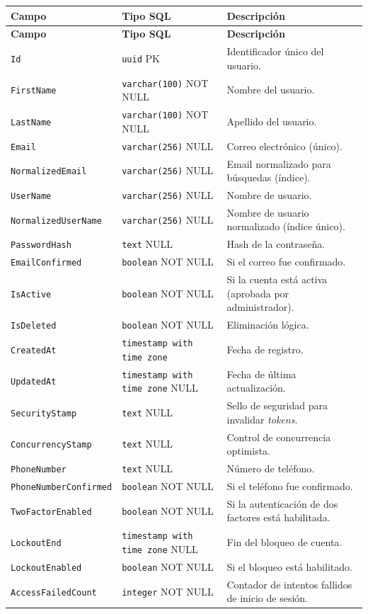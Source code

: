 \begin{longtable}{|p{3.5cm}|p{4cm}|p{7cm}|}
\hline
\textbf{Campo} & \textbf{Tipo SQL} & \textbf{Descripción} \\
\hline
\endfirsthead
\hline
\textbf{Campo} & \textbf{Tipo SQL} & \textbf{Descripción} \\
\hline
\endhead
\texttt{Id} & \texttt{uuid} PK & Identificador único del usuario. \\
\hline
\texttt{FirstName} & \texttt{varchar(100)} NOT NULL & Nombre del usuario. \\
\hline
\texttt{LastName} & \texttt{varchar(100)} NOT NULL & Apellido del usuario. \\
\hline
\texttt{Email} & \texttt{varchar(256)} NULL & Correo electrónico (único). \\
\hline
\texttt{NormalizedEmail} & \texttt{varchar(256)} NULL & Email normalizado para búsquedas (índice). \\
\hline
\texttt{UserName} & \texttt{varchar(256)} NULL & Nombre de usuario. \\
\hline
\texttt{Normalized\-UserName} & \texttt{varchar(256)} NULL & Nombre de usuario normalizado (índice único). \\
\hline
\texttt{PasswordHash} & \texttt{text} NULL & Hash de la contraseña. \\
\hline
\texttt{EmailConfirmed} & \texttt{boolean} NOT NULL & Si el correo fue confirmado. \\
\hline
\texttt{IsActive} & \texttt{boolean} NOT NULL & Si la cuenta está activa (aprobada por administrador). \\
\hline
\texttt{IsDeleted} & \texttt{boolean} NOT NULL & Eliminación lógica. \\
\hline
\texttt{CreatedAt} & \texttt{timestamp with time zone} & Fecha de registro. \\
\hline
\texttt{UpdatedAt} & \texttt{timestamp with time zone} NULL & Fecha de última actualización. \\
\hline
\texttt{SecurityStamp} & \texttt{text} NULL & Sello de seguridad para invalidar \textit{tokens}. \\
\hline
\texttt{Concurrency\-Stamp} & \texttt{text} NULL & Control de concurrencia optimista. \\
\hline
\texttt{PhoneNumber} & \texttt{text} NULL & Número de teléfono. \\
\hline
\texttt{PhoneNumber\-Confirmed} & \texttt{boolean} NOT NULL & Si el teléfono fue confirmado. \\
\hline
\texttt{TwoFactor\-Enabled} & \texttt{boolean} NOT NULL & Si la autenticación de dos factores está habilitada. \\
\hline
\texttt{LockoutEnd} & \texttt{timestamp with time zone} NULL & Fin del bloqueo de cuenta. \\
\hline
\texttt{LockoutEnabled} & \texttt{boolean} NOT NULL & Si el bloqueo está habilitado. \\
\hline
\texttt{AccessFailed\-Count} & \texttt{integer} NOT NULL & Contador de intentos fallidos de inicio de sesión. \\
\hline
\end{longtable}

